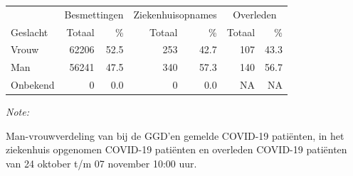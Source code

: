 \documentclass[
  english,
  man,floatsintext]{apa6}
\begin{document}
\begin{table}
\centering\begingroup\fontsize{11}{13}\selectfont

\begin{threeparttable}
\begin{tabular}{lrrrrrr}
\toprule
\multicolumn{1}{c}{ } & \multicolumn{2}{c}{Besmettingen} & \multicolumn{2}{c}{Ziekenhuisopnames} & \multicolumn{2}{c}{Overleden} \\
\cmidrule(l{3pt}r{3pt}){2-3} \cmidrule(l{3pt}r{3pt}){4-5} \cmidrule(l{3pt}r{3pt}){6-7}
Geslacht & Totaal & \% & Totaal & \% & Totaal & \%\\
\midrule
Vrouw & 62206 & 52.5 & 253 & 42.7 & 107 & 43.3\\
Man & 56241 & 47.5 & 340 & 57.3 & 140 & 56.7\\
Onbekend & 0 & 0.0 & 0 & 0.0 & NA & NA\\
\bottomrule
\end{tabular}
\begin{tablenotes}
\item \textit{Note: } 
\item Man-vrouwverdeling van bij de GGD’en gemelde COVID-19 patiënten, in het ziekenhuis opgenomen COVID-19 patiënten en overleden COVID-19 patiënten van 24 oktober t/m 07 november 10:00 uur.
\end{tablenotes}
\end{threeparttable}
\endgroup{}
\end{table}
\newpage
\end{document}
